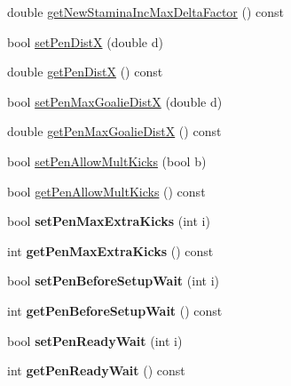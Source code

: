 \begin{DoxyCompactItemize}
double \hyperlink{classServerSettings_a8865c04b5238507a04d979461cf05cc1}{get\+New\+Stamina\+Inc\+Max\+Delta\+Factor} () const 
\item 
bool \hyperlink{classServerSettings_a5f9d08c5393ce55c72616e265d5beba3}{set\+Pen\+DistX} (double d)
\item 
double \hyperlink{classServerSettings_af5db055dcbfdfb35de09c2c365891636}{get\+Pen\+DistX} () const 
\item 
bool \hyperlink{classServerSettings_a8e04b3db869ea61330d4bb807d658be3}{set\+Pen\+Max\+Goalie\+DistX} (double d)
\item 
double \hyperlink{classServerSettings_ac43b5188bb72420b5294bb041de47a45}{get\+Pen\+Max\+Goalie\+DistX} () const 
\item 
bool \hyperlink{classServerSettings_a5aaaafc1c31a33e661b0d2b1ea7be2b3}{set\+Pen\+Allow\+Mult\+Kicks} (bool b)
\item 
bool \hyperlink{classServerSettings_a5da97d527638da8c9b9e43b05a37d392}{get\+Pen\+Allow\+Mult\+Kicks} () const 
\item 
bool {\bfseries set\+Pen\+Max\+Extra\+Kicks} (int i)\hypertarget{classServerSettings_a80943011afc16fbdf1078bc3cb2e7769}{}\label{classServerSettings_a80943011afc16fbdf1078bc3cb2e7769}

\item 
int {\bfseries get\+Pen\+Max\+Extra\+Kicks} () const \hypertarget{classServerSettings_a59c561b78fab635ff47910d7b8499e84}{}\label{classServerSettings_a59c561b78fab635ff47910d7b8499e84}

\item 
bool {\bfseries set\+Pen\+Before\+Setup\+Wait} (int i)\hypertarget{classServerSettings_a4ab588988b7a44eaabd296e129e718c5}{}\label{classServerSettings_a4ab588988b7a44eaabd296e129e718c5}

\item 
int {\bfseries get\+Pen\+Before\+Setup\+Wait} () const \hypertarget{classServerSettings_a66b99d1a390ad09875dff4a83034a430}{}\label{classServerSettings_a66b99d1a390ad09875dff4a83034a430}

\item 
bool {\bfseries set\+Pen\+Ready\+Wait} (int i)\hypertarget{classServerSettings_a7f19de6401a51f4fbb81af21e82d0904}{}\label{classServerSettings_a7f19de6401a51f4fbb81af21e82d0904}

\item 
int {\bfseries get\+Pen\+Ready\+Wait} () const \hypertarget{classServerSettings_ae683f4cb31425963cc7812f0a9849523}{}\label{classServerSettings_ae683f4cb31425963cc7812f0a9849523}


\end{DoxyCompactItemize}
